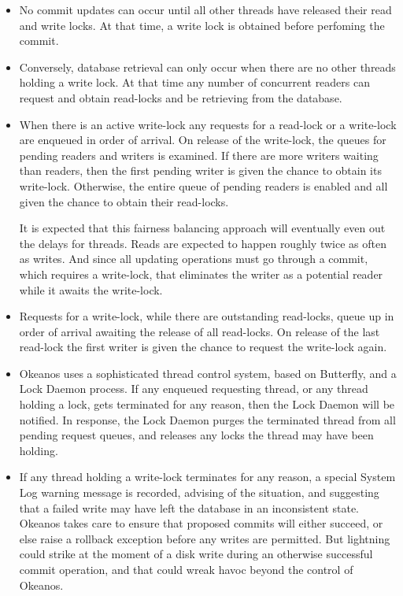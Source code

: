 \documentclass[article,oneside]{memoir}
\begin{document}
\begin{itemize}
\item No commit updates can occur until all other threads have released their read and write locks. At that time, a write lock is obtained before perfoming the commit.

 \item Conversely, database retrieval can only occur when there are no other threads holding a write lock. At that time any number of concurrent readers can request and obtain read-locks and be retrieving from the database.
 
\item When there is an active write-lock any requests for a read-lock or a write-lock are enqueued in order of arrival. On release of the write-lock, the queues for pending readers and writers is examined. If there are more writers waiting than readers, then the first pending writer is given the chance to obtain its write-lock. Otherwise, the entire queue of pending readers is enabled and all given the chance to obtain their read-locks.

It is expected that this fairness balancing approach will eventually even out the delays for threads. Reads are expected to happen roughly twice as often as writes. And since all updating operations must go through a commit, which requires a write-lock, that eliminates the writer as a potential reader while it awaits the write-lock.

\item Requests for a write-lock, while there are outstanding read-locks, queue up in order of arrival awaiting the release of all read-locks. On release of the last read-lock the first writer is given the chance to request the write-lock again.

\item Okeanos uses a sophisticated thread control system, based on Butterfly, and a Lock Daemon process. If any enqueued requesting thread, or any thread holding a lock, gets terminated for any reason, then the Lock Daemon will be notified. In response, the Lock Daemon purges the terminated thread from all pending request queues, and releases any locks the thread may have been holding.

\item If any thread holding a write-lock terminates for any reason, a special System Log warning message is recorded, advising of the situation, and suggesting that a failed write may have left the database in an inconsistent state. Okeanos takes care to ensure that proposed commits will either succeed, or else raise a rollback exception before any writes are permitted. But lightning could strike at the moment of a disk write during an otherwise successful commit operation, and that could wreak havoc beyond the control of Okeanos.

\end{itemize}
\end{document}

